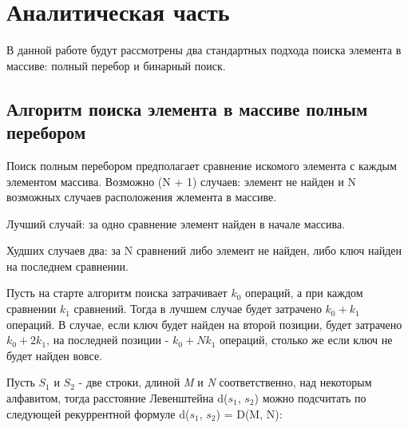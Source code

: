 \chapter{Аналитическая часть}

В данной работе будут рассмотрены два стандартных подхода поиска элемента в массиве: полный перебор и бинарный поиск.

\section{Алгоритм поиска элемента в массиве полным перебором}

Поиск полным перебором предполагает сравнение искомого элемента с каждым элементом массива. Возможно (N + 1) случаев: элемент не найден и N возможных случаев расположения жлемента в массиве.

Лучший случай: за одно сравнение элемент найден в начале массива.

Худших случаев два: за N сравнений либо элемент не найден, либо ключ найден на последнем сравнении.

Пусть на старте алгоритм поиска затрачивает $k_{0}$ операций, а при каждом сравнении $k_{1}$ сравнений. Тогда в лучшем случае будет затрачено $k_{0} + k_{1}$ операций. В случае, если ключ будет найден на второй позиции, будет затрачено $k_{0} + 2k_{1}$, на последней позиции -  $k_{0} + Nk_{1}$ операций, столько же если ключ не будет найден вовсе.



Пусть $S_{1}$ и $S_{2}$ - две строки, длиной \textit{M} и \textit{N} соответственно, над некоторым алфавитом, тогда расстояние Левенштейна d($s_{1}$, $s_{2}$) можно подсчитать по следующей рекуррентной формуле d($s_{1}$, $s_{2}$) = D(M, N):

